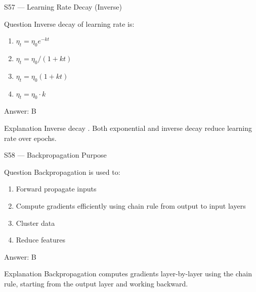 \documentclass[aspectratio=169,8pt]{beamer}
\begin{document}
	\begin{frame}{S57 --- Learning Rate Decay (Inverse)}
		\begin{block}{Question}
			Inverse decay of learning rate is:
			\begin{enumerate}
				\item $\eta_t = \eta_0 e^{-kt}$
				\item $\eta_t = \eta_0/(1+kt)$
				\item $\eta_t = \eta_0(1+kt)$
				\item $\eta_t = \eta_0 \cdot k$
			\end{enumerate}
		\end{block}
		\begin{exampleblock}{Answer: B}\end{exampleblock}
		\begin{block}{Explanation}
			Inverse decay . Both exponential and inverse decay reduce learning rate over epochs.
		\end{block}
	\end{frame}
	
	\begin{frame}{S58 --- Backpropagation Purpose}
		\begin{block}{Question}
			Backpropagation is used to:
			\begin{enumerate}
				\item Forward propagate inputs
				\item Compute gradients efficiently using chain rule from output to input layers
				\item Cluster data
				\item Reduce features
			\end{enumerate}
		\end{block}
		\begin{exampleblock}{Answer: B}\end{exampleblock}
		\begin{block}{Explanation}
			Backpropagation computes gradients layer-by-layer using the chain rule, starting from the output layer and working backward.
		\end{block}
	\end{frame}
	
\end{document}

